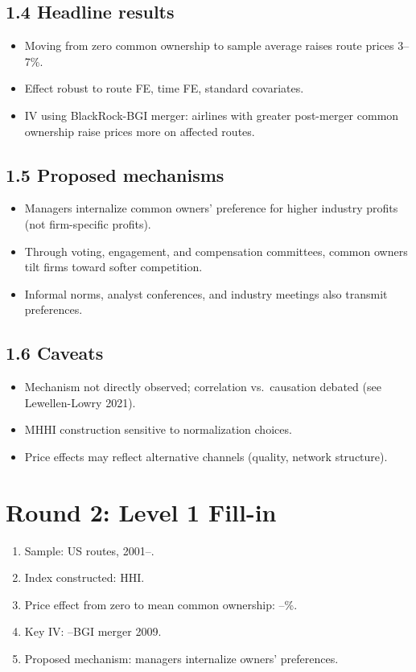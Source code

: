 \documentclass[11pt]{article}
\newcommand{\blank}[1]{\underline{\hspace{#1}}}
\begin{document}
\subsection*{1.4 Headline results}
\begin{itemize}
\item Moving from zero common ownership to sample average raises route prices 3--7\%.
\item Effect robust to route FE, time FE, standard covariates.
\item IV using BlackRock-BGI merger: airlines with greater post-merger common ownership raise prices more on affected routes.
\end{itemize}

\subsection*{1.5 Proposed mechanisms}
\begin{itemize}
\item Managers internalize common owners' preference for higher industry profits (not firm-specific profits).
\item Through voting, engagement, and compensation committees, common owners tilt firms toward softer competition.
\item Informal norms, analyst conferences, and industry meetings also transmit preferences.
\end{itemize}

\subsection*{1.6 Caveats}
\begin{alertbox}
\begin{itemize}
\item Mechanism not directly observed; correlation vs.\ causation debated (see Lewellen-Lowry 2021).
\item MHHI construction sensitive to normalization choices.
\item Price effects may reflect alternative channels (quality, network structure).
\end{itemize}
\end{alertbox}

\section*{Round 2: Level 1 Fill-in}
\begin{enumerate}
\item Sample: US \blank{1.5cm} routes, 2001--\blank{1cm}.
\item Index constructed: \blank{1cm}HHI.
\item Price effect from zero to mean common ownership: \blank{1cm}--\blank{1cm}\%.
\item Key IV: \blank{1.5cm}--BGI merger 2009.
\item Proposed mechanism: managers internalize \blank{2cm} owners' preferences.
\end{enumerate}
\end{document}

